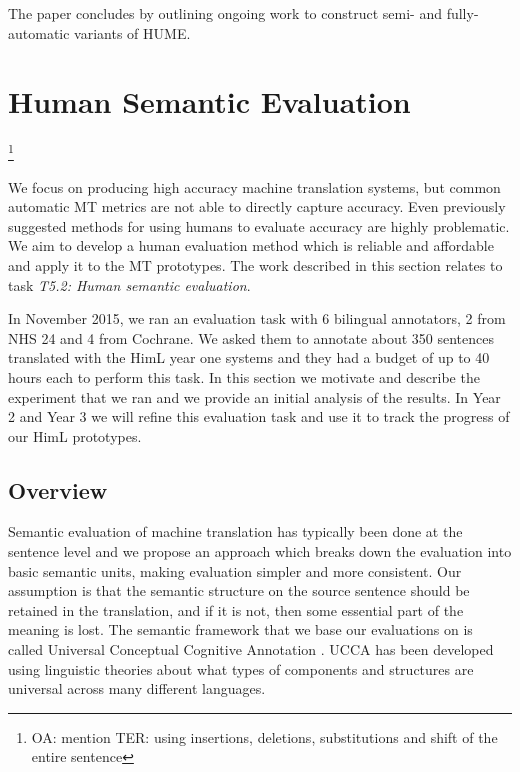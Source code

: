 \documentclass[11pt]{article}
\newcommand{\oa}[1]{\footnote{\color{red}OA: #1}}
\begin{document}
The paper concludes by outlining ongoing work to construct semi- and
fully-automatic variants of HUME.









\section{Human Semantic Evaluation}

\oa{mention TER: using insertions, deletions, substitutions and shift of the entire sentence}

\label{sec:sem-eval:human}
We focus on producing high accuracy machine translation systems, but common 
automatic MT metrics are not able to directly capture accuracy. Even previously suggested methods
for using humans to evaluate accuracy are highly problematic. We aim to  develop a human evaluation method 
which is reliable and affordable and apply it to the MT prototypes. 
The
work described
in this section relates to 
task
\emph{T5.2: Human semantic evaluation}.


In November 2015, we ran an evaluation task with 6 bilingual annotators, 2 from NHS 24 and 4 from Cochrane. 
We asked them to annotate about 350 sentences translated with the HimL year one systems 
and they had a budget of  up  to 40 hours each to perform this task. 
In this section we motivate and describe the experiment that we ran and we provide an initial analysis of
the results. In  Year 2 and Year 3 we will refine this evaluation task and use it to track the progress of our HimL prototypes.


\subsection{Overview}

Semantic evaluation of machine translation has typically been done at the sentence level and
we propose an  approach which breaks down the evaluation into basic semantic units, making evaluation 
simpler and more consistent. 
Our  assumption is that the semantic structure on the source sentence should be 
retained in the translation, and if it is not, then some essential part of the meaning 
is
lost. 
The semantic framework that we base our evaluations on is called 
Universal Conceptual Cognitive Annotation .  
UCCA has been developed using linguistic theories about 
what types of components and structures are universal across many different languages.
\end{document}
